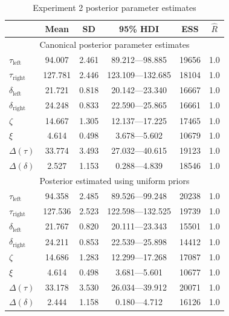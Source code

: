 \documentclass[doc,biblatex,floatsintext]{apa7}
\begin{document}
\clearpage

\begin{table}
\begin{center}
\begin{threeparttable}
\caption{Experiment 2 posterior parameter estimates}
\footnotesize
\begin{tabular}{lccccc}
\toprule
{} &   Mean &     SD &  95\% HDI &  ESS &  $\hat{R}$ \\
\midrule
\multicolumn{6}{c}{Canonical posterior parameter estimates} \\
\midrule
$\tau_\mathrm{left}$  &   94.007 &  2.461 &    89.212---98.885 &   19656 &    1.0 \\
$\tau_\mathrm{right}$ &  127.781 &  2.446 &   123.109---132.685 &   18104 &    1.0 \\
$\delta_\mathrm{left}$  &   21.721 &  0.818 &    20.142---23.340 &   16667 &    1.0 \\
$\delta_\mathrm{right}$ &   24.248 &  0.833 &    22.590---25.865 &   16661 &    1.0 \\
$\zeta$        &   14.667 &  1.305 &    12.137---17.225 &   17465 &    1.0 \\
$\xi$        &    4.614 &  0.498 &     3.678---5.602 &   10679 &    1.0 \\
$\Delta(\tau)$     &   33.774 &  3.493 &    27.032---40.615 &   19123 &    1.0 \\
$\Delta(\delta)$     &    2.527 &  1.153 &     0.288---4.839 &   18546 &    1.0 \\
\midrule
\multicolumn{6}{c}{Posterior estimated using uniform priors} \\
\midrule
$\tau_\mathrm{left}$  &   94.358 &  2.485 &    89.526---99.248 &   20238 &    1.0 \\
$\tau_\mathrm{right}$ &  127.536 &  2.523 &   122.598---132.525 &   19739 &    1.0 \\
$\delta_\mathrm{left}$  &   21.767 &  0.820 &    20.111---23.343 &   15501 &    1.0 \\
$\delta_\mathrm{right}$ &   24.211 &  0.853 &    22.539---25.898 &   14412 &    1.0 \\
$\zeta$        &   14.686 &  1.283 &    12.299---17.268 &   17087 &    1.0 \\
$\xi$        &    4.614 &  0.498 &     3.681---5.601 &   10677 &    1.0 \\
$\Delta(\tau)$     &   33.178 &  3.530 &    26.034---39.912 &   20071 &    1.0 \\
$\Delta(\delta)$     &    2.444 &  1.158 &     0.180---4.712 &   16126 &    1.0 \\

\end{tabular}
\end{threeparttable}
\end{center}
\end{table}
\end{document}
